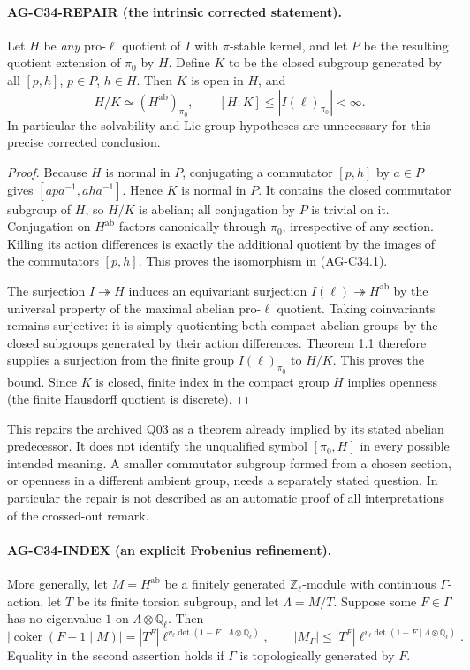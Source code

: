 \paragraph{AG-C34-REPAIR (the intrinsic corrected statement).}
Let $H$ be \emph{any} pro-$\ell$ quotient of $I$ with $\pi$-stable
kernel, and let $P$ be the resulting quotient extension of $\pi_0$ by
$H$. Define $K$ to be the closed subgroup generated by all
$[p,h]$, $p\in P$, $h\in H$. Then $K$ is open in $H$, and
\[
 H/K\simeq (H^{\mathrm{ab}})_{\pi_0},
 \qquad [H:K]\le |I(\ell)_{\pi_0}|<\infty.       \tag{AG-C34.1}
\]
In particular the solvability and Lie-group hypotheses are unnecessary
for this precise corrected conclusion.

\begin{proof}
Because $H$ is normal in $P$, conjugating a commutator $[p,h]$ by
$a\in P$ gives $[apa^{-1},aha^{-1}]$. Hence $K$ is normal in $P$.
It contains the closed commutator subgroup of $H$, so $H/K$ is abelian;
all conjugation by $P$ is trivial on it. Conjugation on
$H^{\mathrm{ab}}$ factors canonically through $\pi_0$, irrespective
of any section. Killing its action differences is exactly the additional
quotient by the images of the commutators $[p,h]$. This proves the
isomorphism in (AG-C34.1).

The surjection $I\twoheadrightarrow H$ induces an equivariant
surjection $I(\ell)\twoheadrightarrow H^{\mathrm{ab}}$ by the
universal property of the maximal abelian pro-$\ell$ quotient.
Taking coinvariants remains surjective: it is simply quotienting both
compact abelian groups by the closed subgroups generated by their
action differences. Theorem 1.1 therefore supplies a surjection from
the finite group $I(\ell)_{\pi_0}$ to $H/K$. This proves the bound.
Since $K$ is closed, finite index in the compact group $H$ implies
openness (the finite Hausdorff quotient is discrete).
\end{proof}

This repairs the archived Q03 as a theorem already implied by its
stated abelian predecessor. It does not identify the unqualified
symbol $[\pi_0,H]$ in every possible intended meaning. A smaller
commutator subgroup formed from a chosen section, or openness in a
different ambient group, needs a separately stated question. In
particular the repair is not described as an automatic proof of all
interpretations of the crossed-out remark.

\paragraph{AG-C34-INDEX (an explicit Frobenius refinement).}
More generally, let $M=H^{\mathrm{ab}}$ be a finitely generated
$\mathbb Z_\ell$-module with continuous $\Gamma$-action, let $T$ be
its finite torsion subgroup, and let $\Lambda=M/T$. Suppose some
$F\in\Gamma$ has no eigenvalue $1$ on
$\Lambda\otimes\mathbb Q_\ell$. Then
\[
 |\operatorname{coker}(F-1\mid M)|
   =|T^F|\ell^{v_\ell\det(1-F\mid\Lambda\otimes\mathbb Q_\ell)},
 \qquad
 |M_\Gamma|\le
 |T^F|\ell^{v_\ell\det(1-F\mid\Lambda\otimes\mathbb Q_\ell)}.
                                                               \tag{AG-C34.2}
\]
Equality in the second assertion holds if $\Gamma$ is topologically
generated by $F$.


